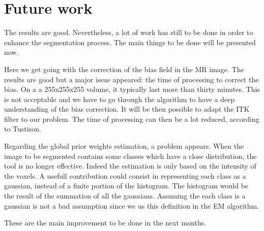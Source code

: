 \section{Future work}
The results are good. Nevertheless, a lot of work has still to be done in order to enhance the segmentation process. The main things to be done will be presented now.
\par
Here we get going with the correction of the bias field in the MR image. The results are good but a major issue appeared: the time of processing to correct the bias. On a a 255x255x255 volume, it typically last more than thirty minutes. This is not acceptable and we have to go through the algorithm to have a deep understanding of the bias correction. It will be then possible to adapt the ITK filter to our problem. The time of processing can then be a lot reduced, according to Tustison.
\par
Regarding the global prior weights estimation, a problem appears. When the image to be segmented contains some classes which have a close distribution, the tool is no longer effective. Indeed the estimation is only based on the intensity of the voxels. A usefull contribution could consist in representing each class as a gaussian, instead of a finite portion of the histogram. The histogram would be the result of the summation of all the gaussians. Assuming the each class is a gaussian is not a bad assumption since we us this definition in the EM algorithm.
\par
These are the main improvement to be done in the next months.




